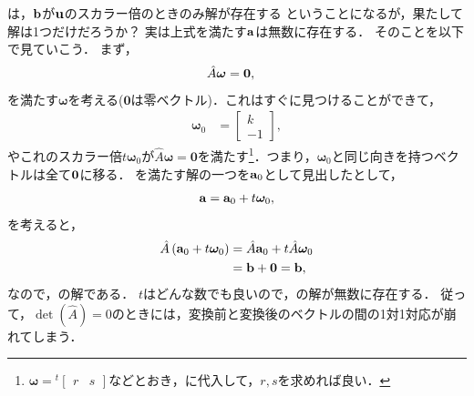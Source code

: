は，${\bf b}$が${\bf u}$のスカラー倍のときのみ解が存在する
ということになるが，果たして解は1つだけだろうか？
実は上式を満たす${\bf a}$は無数に存在する．
そのことを以下で見ていこう．
まず，
\begin{align}
\hat{A}\bm{\omega} & ={\bf 0},
\end{align}
を満たす$\bm{\omega}$を考える($\bm{0}$は零ベクトル)．これはすぐに見つけることができて，
\begin{align}
\bm{\omega}_{0} & =\left[\begin{array}{c}
k\\
-1
\end{array}\right], \label{LA:Aw=0} 
\end{align}
やこれのスカラー倍$t\bm{\omega}_{0}$が$\hat{A}\bm{\omega} = \bm{0}$を満たす\footnote{$\bm{\omega} = {}^{t}[\begin{array}{cc} r & s\end{array}]$などとおき，に代入して，$r,s$を求めれば良い．}．つまり，$\bm{\omega}_{0}$と同じ向きを持つベクトルは全て${\bf 0}$に移る．
を満たす解の一つを${\bf a}_{0}$として見出したとして，
\begin{align}
 {\bf a} = {\bf a}_{0} + t \bm{\omega}_{0}, 
\end{align}
を考えると，
\begin{align}
\hat{A}\left({\bf a}_{0}+t\bm{\omega}_{0}\right)
&=\hat{A}{\bf a}_{0}+t\hat{A}\bm{\omega}_{0} \notag \\
& ={\bf b}+{\bf 0}={\bf b},
\end{align}
なので，の解である．
$t$はどんな数でも良いので，の解が無数に存在する．
従って，$\det(\hat{A})=0$のときには，変換前と変換後のベクトルの間の1対1対応が崩れてしまう．


